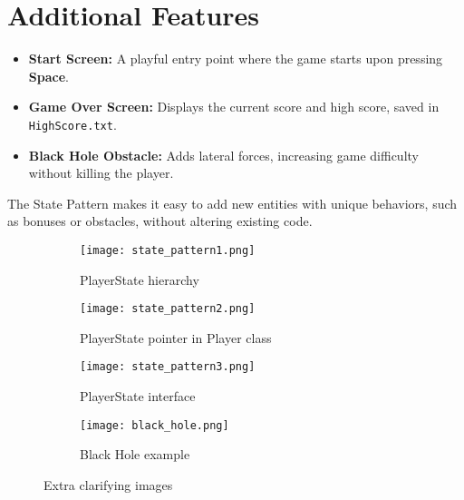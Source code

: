 \documentclass{article}
\begin{document}
\section*{Additional Features}
\begin{itemize}
    \item \textbf{Start Screen:} A playful entry point where the game starts upon pressing \textbf{Space}.
    \item \textbf{Game Over Screen:} Displays the current score and high score, saved in \texttt{HighScore.txt}.
    \item \textbf{Black Hole Obstacle:} Adds lateral forces, increasing game difficulty without killing the player.
\end{itemize}

The State Pattern makes it easy to add new entities with unique behaviors, such as bonuses or obstacles, without altering existing code.

\begin{figure}[htbp]
    \centering
    \begin{subfigure}{0.45\textwidth}
        \centering
        \texttt{[image: state\_pattern1.png]}
        \caption{PlayerState hierarchy}
    \end{subfigure}
    \hfill
    \begin{subfigure}{0.45\textwidth}
        \centering
        \texttt{[image: state\_pattern2.png]}
        \caption{PlayerState pointer in Player class}
    \end{subfigure}

    \vspace{0.5cm} %
    \begin{subfigure}{0.45\textwidth}
        \centering
        \texttt{[image: state\_pattern3.png]}
        \caption{PlayerState interface}
    \end{subfigure}
    \hfill
    \begin{subfigure}{0.45\textwidth}
        \centering
        \texttt{[image: black\_hole.png]}
        \caption{Black Hole example}
    \end{subfigure}
    \caption{Extra clarifying images}
\end{figure}
\end{document}
